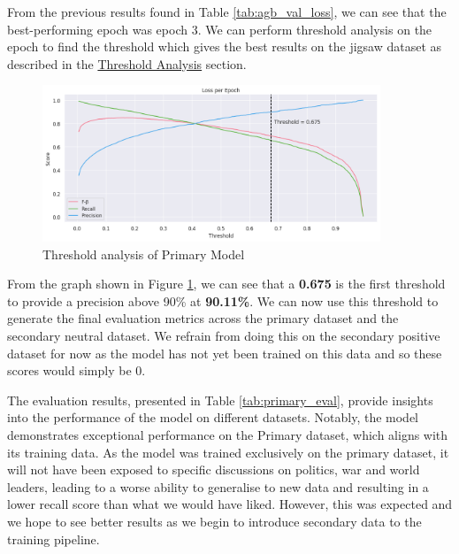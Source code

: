 From the previous results found in Table \ref{tab:agb_val_loss}, we can see that the best-performing epoch was epoch 3. We can perform threshold analysis on the epoch to find the threshold which gives the best results on the jigsaw dataset as described in the \hyperref[threshold]{Threshold Analysis} section.

\begin{figure}[H]
    \centering
    \includegraphics[width=0.9\textwidth]{graphs/training/primary_threshold.png}
    \caption{Threshold analysis of Primary Model}
    \label{fig:primary_threshold}
\end{figure}

From the graph shown in Figure \ref{fig:primary_threshold}, we can see that a \textbf{0.675} is the first threshold to provide a precision above 90\% at \textbf{90.11\%}. We can now use this threshold to generate the final evaluation metrics across the primary dataset and the secondary neutral dataset. We refrain from doing this on the secondary positive dataset for now as the model has not yet been trained on this data and so these scores would simply be 0.

\begin{table}[ht]
    \vspace{5pt}
    \caption{F-beta scores for different ratios}
    \label{tab:primary_eval}
\end{table}

The evaluation results, presented in Table \ref{tab:primary_eval}, provide insights into the performance of the model on different datasets. Notably, the model demonstrates exceptional performance on the Primary dataset, which aligns with its training data. As the model was trained exclusively on the primary dataset, it will not have been exposed to specific discussions on politics, war and world leaders, leading to a worse ability to generalise to new data and resulting in a lower recall score than what we would have liked. However, this was expected and we hope to see better results as we begin to introduce secondary data to the training pipeline.

